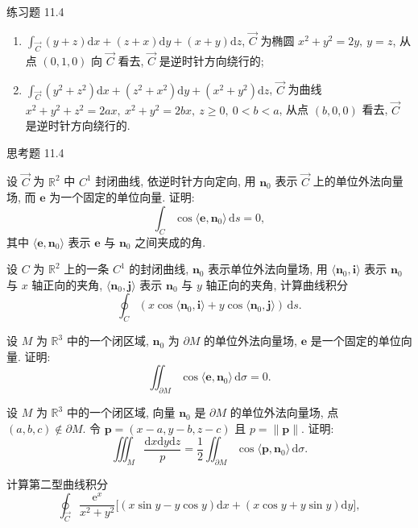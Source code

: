 \begin{exblock}{练习题 11.4}
\begin{enumerate}[label=(\arabic*),leftmargin=2.6em,itemsep=0.15\baselineskip,topsep=0.2\baselineskip]
  \item $\displaystyle\int_{\overrightarrow{C}}(y+z)\mathrm{d}x+(z+x)\mathrm{d}y+(x+y)\mathrm{d}z$, $\overrightarrow{C}$ 为椭圆 $x^{2}+y^{2}=2y,\ y=z$, 从点 $(0,1,0)$ 向 $\overrightarrow{C}$ 看去, $\overrightarrow{C}$ 是逆时针方向绕行的;
  \item $\displaystyle\int_{\overrightarrow{C}}(y^{2}+z^{2})\mathrm{d}x+(z^{2}+x^{2})\mathrm{d}y+(x^{2}+y^{2})\mathrm{d}z$, $\overrightarrow{C}$ 为曲线 $x^{2}+y^{2}+z^{2}=2ax,\ x^{2}+y^{2}=2bx,\ z\geqslant0,\ 0<b<a$, 从点 $(b,0,0)$ 看去, $\overrightarrow{C}$ 是逆时针方向绕行的.
  \end{enumerate}
\end{exblock}

\begin{exblock}{思考题 11.4}
\item 设 $\overrightarrow{C}$ 为 $\mathbb{R}^{2}$ 中 $C^{1}$ 封闭曲线, 依逆时针方向定向, 用 $\boldsymbol{n}_{0}$ 表示 $\overrightarrow{C}$ 上的单位外法向量场, 而 $\boldsymbol{e}$ 为一个固定的单位向量. 证明:
  \[
  \int_{C}\cos\langle\boldsymbol{e},\boldsymbol{n}_{0}\rangle\,\mathrm{d}s=0,
  \]
  其中 $\langle\boldsymbol{e},\boldsymbol{n}_{0}\rangle$ 表示 $\boldsymbol{e}$ 与 $\boldsymbol{n}_{0}$ 之间夹成的角.
\item 设 $C$ 为 $\mathbb{R}^{2}$ 上的一条 $C^{1}$ 的封闭曲线, $\boldsymbol{n}_{0}$ 表示单位外法向量场, 用 $\langle\boldsymbol{n}_{0},\boldsymbol{i}\rangle$ 表示 $\boldsymbol{n}_{0}$ 与 $x$ 轴正向的夹角, $\langle\boldsymbol{n}_{0},\boldsymbol{j}\rangle$ 表示 $\boldsymbol{n}_{0}$ 与 $y$ 轴正向的夹角, 计算曲线积分
  \[
  \oint_{C}(x\cos\langle\boldsymbol{n}_{0},\boldsymbol{i}\rangle+y\cos\langle\boldsymbol{n}_{0},\boldsymbol{j}\rangle)\,\mathrm{d}s.
  \]
\item 设 $M$ 为 $\mathbb{R}^{3}$ 中的一个闭区域, $\boldsymbol{n}_{0}$ 为 $\partial M$ 的单位外法向量场, $\boldsymbol{e}$ 是一个固定的单位向量. 证明:
  \[
  \iint_{\partial M}\cos\langle\boldsymbol{e},\boldsymbol{n}_{0}\rangle\,\mathrm{d}\sigma=0.
  \]
\item 设 $M$ 为 $\mathbb{R}^{3}$ 中的一个闭区域, 向量 $\boldsymbol{n}_{0}$ 是 $\partial M$ 的单位外法向量场, 点 $(a,b,c)\notin\partial M$. 令 $\boldsymbol{p}=(x-a,y-b,z-c)$ 且 $p=\lVert\boldsymbol{p}\rVert$. 证明:
  \[
  \iiint_{M}\frac{\mathrm{d}x\mathrm{d}y\mathrm{d}z}{p}=\frac{1}{2}\iint_{\partial M}\cos\langle\boldsymbol{p},\boldsymbol{n}_{0}\rangle\,\mathrm{d}\sigma.
  \]
\item 计算第二型曲线积分
  \[
  \oint_{\overrightarrow{C}}\frac{\mathrm{e}^{x}}{x^{2}+y^{2}}\bigl[(x\sin y-y\cos y)\mathrm{d}x+(x\cos y+y\sin y)\mathrm{d}y\bigr],
\]
\end{exblock}
